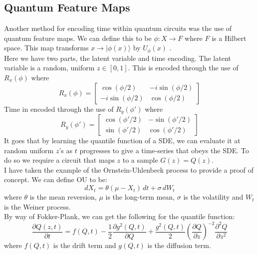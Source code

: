 \documentclass[12pt]{article}
\numberwithin{equation}{section}
\begin{document}
\subsection{Quantum Feature Maps}
Another method for encoding time within quantum circuits was the use of
quantum feature maps. We can define this to be $\phi : X \rightarrow F$ where $F$
is a Hilbert space. This map transforms $x \rightarrow |\phi(x)\rangle$ by  $U_\phi(x)$\autocite{paine_quantum_2023,steinbrecher_quantile_2008,vlasic_quantum_2024} .
\\ 
Here we have two parts, the latent variable and time encoding. The latent variable 
is a random, uniform $z \in [0,1] $. This is encoded through the use of $R_x(\phi)$ where 
\begin{equation}
R_x(\phi) = 
\begin{bmatrix}
\cos(\phi/2) & -i\sin(\phi/2) \\
-i\sin(\phi/2) & \cos(\phi/2)
\end{bmatrix}
\end{equation}
Time in encoded through the use of $R_y(\phi')$ where 
\begin{equation}
R_y(\phi') = 
\begin{bmatrix}
\cos(\phi'/2) & -\sin(\phi'/2) \\
\sin(\phi'/2) & \cos(\phi'/2)
\end{bmatrix}
\end{equation}
It goes that by learning the quantile function of a SDE, we can evaluate it at 
random uniform $z$'s as $t$ progresses to give a time-series that obeys the 
SDE. To do so we require a circuit that maps $z$ to a sample $G(z) = Q(z)$. \\ 
I have taken the example of the Ornstein-Uhlenbeck process to provide a proof of 
concept. We can define OU to be: 
\begin{equation}
  dX_t = \theta (\mu - X_t) \, dt + \sigma \, dW_t 
\end{equation}
where $\theta$ is the mean reversion, $\mu$ is the long-term mean, $\sigma$ is the 
volatility and $W_t$ is the Weiner process. 
\\
By way of Fokker-Plank, we can get the following for the quantile function:
\begin{equation}
  \frac{\partial Q(z,t)}{\partial t} = f(Q,t) - \frac{1}{2}\frac{\partial g^2(Q,t)}
{\partial Q} + \frac{g^2(Q,t)}{2}(\frac{\partial Q}{\partial z})^{-2}
  \frac{\partial ^2Q}{\partial z^2}
\end{equation}
where $f(Q,t)$ is the drift term and $g(Q,t)$ is the diffusion term.
\end{document}
